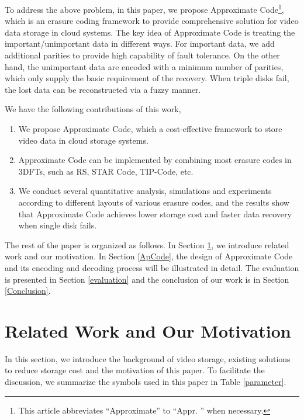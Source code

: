 \documentclass[sigconf]{acmart}
\begin{document}
To address the above problem, in this paper, we propose Approximate Code\footnote{This article abbreviates ``Approximate'' to ``Appr. '' when necessary.}, which is an erasure coding framework to provide comprehensive solution for video data storage in cloud systems. The key idea of Approximate Code is treating the important/unimportant data in different ways. For important data, we add additional parities to provide high capability of fault tolerance. On the other hand, the unimportant data are encoded with a minimum number of parities, which only supply the basic requirement of the recovery. When triple disks fail, the lost data can be reconstructed via a fuzzy manner.

We have the following contributions of this work,
\begin{enumerate}
\item We propose Approximate Code, which a cost-effective framework to store video data in cloud storage systems.
\item Approximate Code can be implemented by combining most erasure codes in 3DFTs, such as RS, STAR Code, TIP-Code, etc.
\item We conduct several quantitative analysis, simulations and experiments according to different layouts of various erasure codes, and the results show that Approximate Code achieves lower storage cost and faster data recovery when single disk fails.
\end{enumerate}

The rest of the paper is organized as follows. In Section \ref{RelatedWork}, we introduce related work and our motivation. 
In Section \ref{ApCode}, the design of Approximate Code and its encoding and decoding process will be illustrated in detail. 
The evaluation is presented in Section \ref{evaluation} and the conclusion of our work is in Section \ref{Conclusion}. 

\section{Related Work and Our Motivation}\label{RelatedWork}
In this section, we introduce the background of video storage, existing solutions to reduce storage cost and the motivation of this paper.
To facilitate the discussion, we summarize the symbols used in this paper in Table \ref{parameter}.
\end{document}
